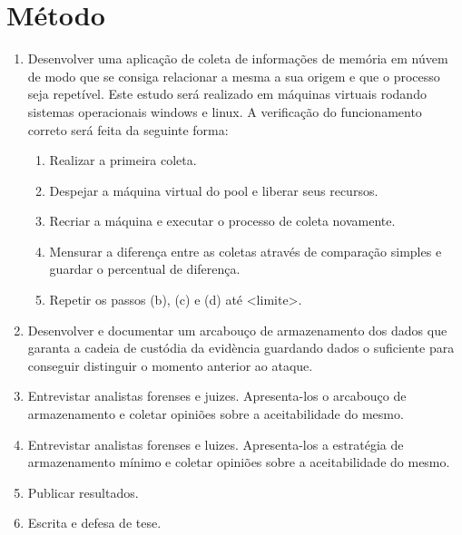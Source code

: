 \documentclass[12pt,				%
	openright,			%
	oneside,			%
	a4paper,			%
	english,			%
	brazil				%
	]{abntex2}
\begin{document}
\chapter{Método} \label{chap:metodo}
\begin{enumerate}
 \item Desenvolver uma aplicação de coleta de informações de memória em núvem de modo que se consiga relacionar a mesma a sua origem e que
o processo seja repetível. Este estudo será realizado em máquinas virtuais rodando sistemas operacionais windows e linux. A verificação do funcionamento correto será feita 
da seguinte forma:

\begin{enumerate}
 \item Realizar a primeira coleta.
 \item Despejar a máquina virtual do pool e liberar seus recursos.
 \item Recriar a máquina e executar o processo de coleta novamente.
 \item Mensurar a diferença entre as coletas através de comparação simples e guardar o percentual de diferença.
 \item Repetir os passos (b), (c) e (d) até <limite>.
\end{enumerate}

\item Desenvolver e documentar um arcabouço de armazenamento dos dados que garanta a cadeia de custódia da evidència guardando dados o suficiente para 
conseguir distinguir o momento anterior ao ataque.

\item Entrevistar analistas forenses e juizes. Apresenta-los o arcabouço de armazenamento e coletar opiniões sobre a aceitabilidade do mesmo.

\item Entrevistar analistas forenses e luizes. Apresenta-los a estratégia de armazenamento mínimo e coletar opiniões sobre a aceitabilidade do mesmo. 

\item Publicar resultados.

\item Escrita e defesa de tese.

\end{enumerate}
\end{document}
